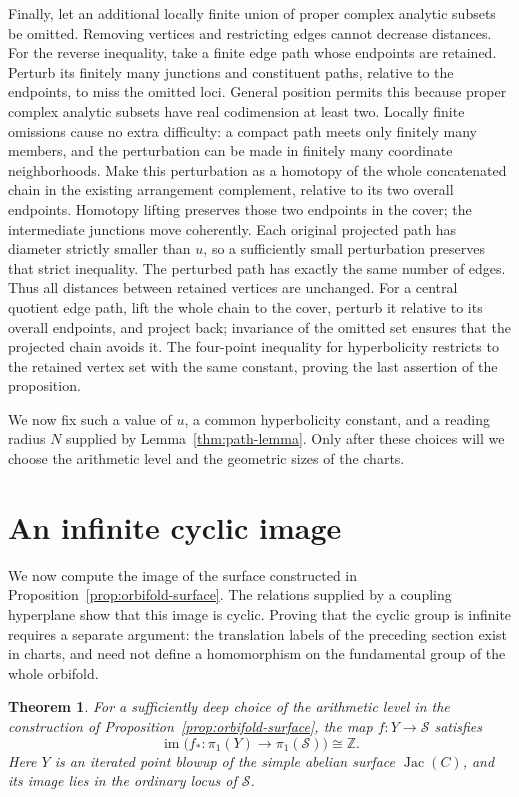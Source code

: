 \documentclass[11pt,reqno]{amsart}
\numberwithin{equation}{section}
\newtheorem{theorem}{Theorem}[section]
\theoremstyle{definition}
\theoremstyle{remark}
\begin{document}
Finally, let an additional locally finite union of proper complex
analytic subsets be omitted.  Removing vertices and restricting
edges cannot decrease distances.  For the reverse inequality,
take a finite edge path whose endpoints are retained.  Perturb
its finitely many junctions and constituent paths, relative to
the endpoints, to miss the omitted loci.  General position permits
this because proper complex analytic subsets have real codimension
at least two.  Locally finite omissions cause no extra difficulty:
a compact path meets only finitely many members, and the
perturbation can be made in finitely many coordinate neighborhoods.
Make this perturbation as a homotopy of the whole concatenated
chain in the existing arrangement complement, relative to its two
overall endpoints.  Homotopy lifting preserves those two endpoints
in the cover; the intermediate junctions move coherently.  Each
original projected path has diameter strictly smaller than $u$, so a
sufficiently small perturbation preserves that strict inequality.
The perturbed path has exactly the same number of edges.  Thus
all distances between retained vertices are unchanged.  For a
central quotient edge path, lift the whole chain to the cover, perturb it relative to its overall endpoints, and project
back; invariance of the omitted set ensures that the projected
chain avoids it.  The four-point inequality for hyperbolicity
restricts to the retained vertex set with the same constant, proving the
last assertion of the proposition.

We now fix such a value of $u$, a common hyperbolicity constant,
and a reading radius $N$ supplied by Lemma~\ref{thm:path-lemma}.
Only after these choices will we choose the arithmetic level and
the geometric sizes of the charts.

\section{An infinite cyclic image}\label{sec:image}

We now compute the image of the surface constructed in
Proposition~\ref{prop:orbifold-surface}.  The relations supplied by a
coupling hyperplane show that this image is cyclic.  Proving that the
cyclic group is infinite requires a separate argument: the translation
labels of the preceding section exist in charts, and need not define a
homomorphism on the fundamental group of the whole orbifold.

\begin{theorem}\label{thm:orbifold-cyclic}
For a sufficiently deep choice of the arithmetic level in the
construction of Proposition~\ref{prop:orbifold-surface}, the map
$f:Y\longrightarrow\mathcal S$ satisfies
\[
 \operatorname{im}\bigl(f_*:\pi_1(Y)\longrightarrow\pi_1(\mathcal S)\bigr)\cong\mathbb Z.
\]
Here $Y$ is an iterated point blowup of the simple abelian surface
$\operatorname{Jac}(C)$, and its image lies in the ordinary locus of $\mathcal S$.
\end{theorem}
\end{document}

